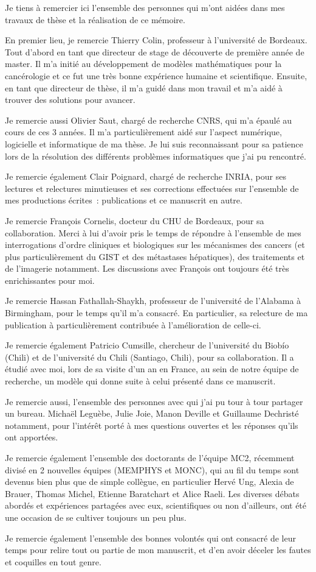 Je tiens à remercier ici  l'ensemble des personnes qui m'ont aidées dans mes travaux de thèse et la réalisation de ce mémoire.

En premier lieu, je remercie Thierry Colin, professeur à l'université de Bordeaux. Tout d'abord en tant que directeur de stage de découverte de première année de master. Il m'a initié au développement de modèles mathématiques pour la cancérologie et ce fut une très bonne expérience humaine et scientifique. Ensuite, en tant que directeur de thèse, il m'a guidé dans mon travail et m'a aidé à trouver des solutions pour avancer. 

Je remercie aussi Olivier Saut, chargé de recherche CNRS, qui m'a épaulé au cours de ces 3 années. Il m'a particulièrement aidé sur l'aspect numérique, logicielle et informatique de ma thèse. Je lui suis reconnaissant pour sa patience lors de la résolution des différents problèmes informatiques que j'ai pu rencontré. 

Je remercie également Clair Poignard, chargé de recherche INRIA, pour ses lectures et relectures minutieuses et ses corrections effectuées sur l'ensemble de mes productions écrites~: publications et ce manuscrit en autre.

Je remercie François Cornelis, docteur du CHU de Bordeaux, pour sa collaboration. Merci à lui d'avoir pris le temps de répondre à l'ensemble de mes interrogations d'ordre cliniques et biologiques sur les mécanismes des cancers (et plus particulièrement du GIST et des métastases hépatiques), des traitements et de l'imagerie notamment. Les discussions avec François ont toujours été très enrichissantes pour moi. 

Je remercie Hassan Fathallah-Shaykh, professeur de l'université de l'Alabama à Birmingham, pour le temps qu'il m'a consacré. En particulier, sa relecture de ma publication à particulièrement contribuée à l'amélioration de celle-ci.

Je remercie également Patricio Cumsille, chercheur de l'université du Biobío (Chili) et de l'université du Chili (Santiago, Chili), pour sa collaboration. Il a étudié avec moi, lors de sa visite d'un an en France, au sein de notre équipe de recherche, un modèle qui donne suite à celui présenté dans ce manuscrit. 

Je remercie aussi, l'ensemble des personnes avec qui j'ai pu tour à tour partager un bureau. Michaël Leguèbe, Julie Joie, Manon Deville et Guillaume Dechristé notamment, pour l'intérêt porté à mes questions ouvertes et les réponses qu'ils ont apportées.

Je remercie également l'ensemble des doctorants de l'équipe MC2,  récemment divisé en 2 nouvelles équipes (MEMPHYS et MONC), qui au fil du temps sont devenus bien plus que de simple collègue, en particulier Hervé Ung, Alexia de Brauer, Thomas Michel, Etienne Baratchart et Alice Raeli. Les diverses débats abordés et expériences partagées avec eux, scientifiques ou non d'ailleurs, ont été une occasion de se cultiver toujours un peu plus.

Je remercie également l'ensemble des bonnes volontés qui ont consacré de leur temps pour relire tout ou partie de mon manuscrit, et d'en avoir  déceler les fautes et coquilles en tout genre.